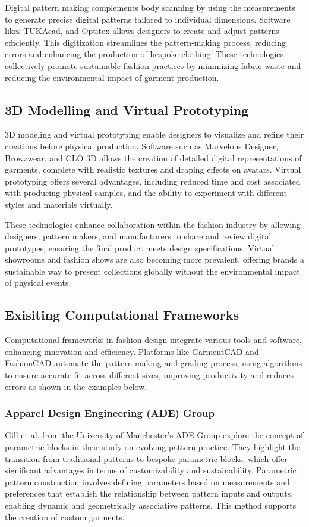 Digital pattern making complements body scanning by using the measurements to generate precise digital patterns tailored to individual dimensions. Software likes TUKAcad, and Optitex allows designers to create and adjust patterns efficiently. This digitization streamlines the pattern-making process, reducing errors and enhancing the production of bespoke clothing. These technologies collectively promote sustainable fashion practices by minimizing fabric waste and reducing the environmental impact of garment production.

\subsection{3D Modelling and Virtual Prototyping}
3D modeling and virtual prototyping enable designers to visualize and refine their creations before physical production. Software such as Marvelous Designer, Browzwear, and CLO 3D allows the creation of detailed digital representations of garments, complete with realistic textures and draping effects on avatars. Virtual prototyping offers several advantages, including reduced time and cost associated with producing physical samples, and the ability to experiment with different styles and materials virtually.

These technologies enhance collaboration within the fashion industry by allowing designers, pattern makers, and manufacturers to share and review digital prototypes, ensuring the final product meets design specifications. Virtual showrooms and fashion shows are also becoming more prevalent, offering brands a sustainable way to present collections globally without the environmental impact of physical events.

\subsection{Exisiting Computational Frameworks}
Computational frameworks in fashion design integrate various tools and software, enhancing innovation and efficiency. Platforms like GarmentCAD and FashionCAD automate the pattern-making and grading process, using algorithms to ensure accurate fit across different sizes, improving productivity and reduces errors as shown in the examples below.

\subsubsection{Apparel Design Engineering (ADE) Group}
Gill et al. from the University of Manchester's ADE Group explore the concept of parametric blocks in their study on evolving pattern practice. They highlight the transition from traditional patterns to bespoke parametric blocks, which offer significant advantages in terms of customizability and sustainability. Parametric pattern construction involves defining parameters based on measurements and preferences that establish the relationship between pattern inputs and outputs, enabling dynamic and geometrically associative patterns. This method supports the creation of custom garments.

